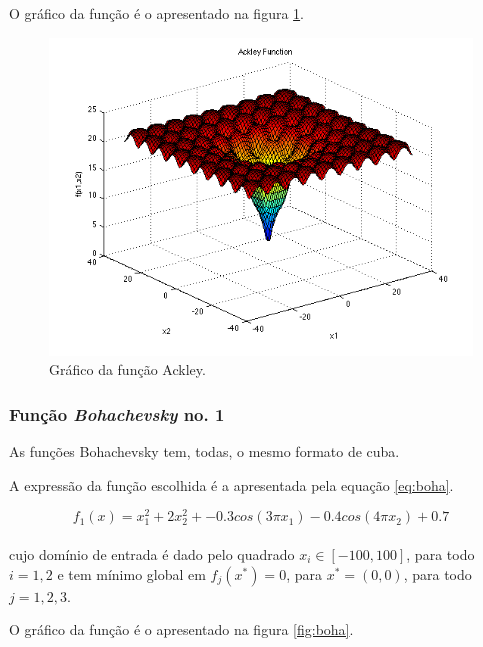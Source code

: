 \documentclass[a4paper,12pt]{article}
\begin{document}
O gráfico da função é o apresentado na figura \ref{fig:ackley}.
\begin{figure}[htb]
\begin{center}
    \includegraphics[scale=0.5]{ackley.png}
    \caption { Gráfico da função Ackley. }
    \label{fig:ackley}
\end{center}
\end{figure}

\newpage
\subsubsection{Função \textit{Bohachevsky} no. 1}

As funções Bohachevsky tem, todas, o mesmo formato de cuba.

A expressão da função escolhida é a apresentada pela equação \ref{eq:boha}.

\begin{equation}
	f_1(x) = x_1^2 + 2x_2^2 + -0.3cos(3\pi x_1) - 0.4cos(4\pi x_2) + 0.7 
\label{eq:boha}
\end{equation}
\\
cujo domínio de entrada é dado pelo quadrado $x_i \in [-100, 100]$, para todo $i = 1, 2$ e tem mínimo global em $f_j(x^*) = 0$, para $x^* = (0,0)$, para todo $j = 1, 2, 3$.

O gráfico da função é o apresentado na figura \ref{fig:boha}.
\end{document}
